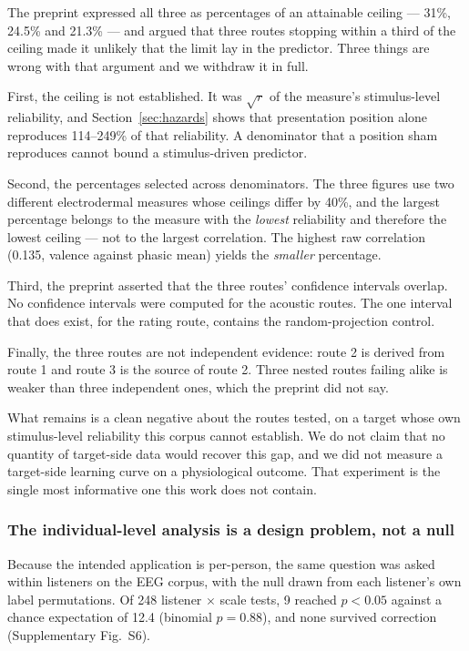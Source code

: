 The preprint expressed all three as percentages of an attainable ceiling ---
31\%, 24.5\% and 21.3\% --- and argued that three routes stopping within a
third of the ceiling made it unlikely that the limit lay in the predictor.
Three things are wrong with that argument and we withdraw it in full.

First, the ceiling is not established. It was $\sqrt{r}$ of the measure's
stimulus-level reliability, and Section~\ref{sec:hazards} shows that
presentation position alone reproduces 114--249\% of that reliability. A
denominator that a position sham reproduces cannot bound a stimulus-driven
predictor.

Second, the percentages selected across denominators. The three figures use
two different electrodermal measures whose ceilings differ by 40\%, and the
largest percentage belongs to the measure with the \emph{lowest} reliability
and therefore the lowest ceiling --- not to the largest correlation. The
highest raw correlation (0.135, valence against phasic mean) yields the
\emph{smaller} percentage.

Third, the preprint asserted that the three routes' confidence intervals
overlap. No confidence intervals were computed for the acoustic routes. The
one interval that does exist, for the rating route, contains the
random-projection control.

Finally, the three routes are not independent evidence: route 2 is derived
from route 1 and route 3 is the source of route 2. Three nested routes failing
alike is weaker than three independent ones, which the preprint did not say.

What remains is a clean negative about the routes tested, on a target whose
own stimulus-level reliability this corpus cannot establish. We do not claim
that no quantity of target-side data would recover this gap, and we did not
measure a target-side learning curve on a physiological outcome. That
experiment is the single most informative one this work does not contain.

\subsubsection{The individual-level analysis is a design problem, not a null}

Because the intended application is per-person, the same question was asked
within listeners on the EEG corpus, with the null drawn from each listener's
own label permutations. Of 248 listener $\times$ scale tests, 9 reached
$p < 0.05$ against a chance expectation of 12.4 (binomial $p = 0.88$), and
none survived correction (Supplementary Fig.~S6).

